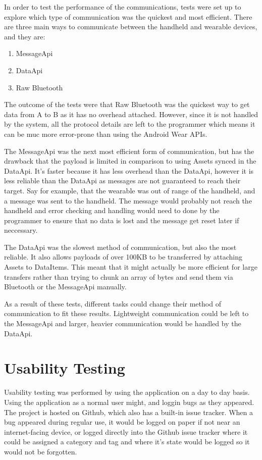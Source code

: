 In order to test the performance of the communications, tests were set up to 
explore which type of communication was the quickest and most efficient. There
are three main ways to communicate between the handheld and wearable devices,
and they are:
\begin{enumerate}
\item MessageApi
\item DataApi
\item Raw Bluetooth
\end{enumerate}

The outcome of the tests were that Raw Bluetooth was the quickest way to get
data from A to B as it has no overhead attached. However, since it is not
handled by the system, all the protocol details are left to the programmer which
means it can be muc more error-prone than using the Android Wear APIs.

The MessageApi was the next most efficient form of communication, but has the
drawback that the payload is limited in comparison to using Assets synced in the
DataApi. It's faster because it has less overhead than the DataApi, however it
is less reliable than the DataApi as messages are not guaranteed to reach their
target. Say for example, that the wearable was out of range of the handheld, and
a message was sent to the handheld. The message would probably not reach the
handheld and error checking and handling would need to done by the programmer to
ensure that no data is lost and the message get reset later if neccessary.

The DataApi was the slowest method of communication, but also the most reliable.
It also allows payloads of over 100KB to be transferred by attaching Assets to
DataItems. This meant that it might actually be more efficient for large
transfers rather than trying to chunk an array of bytes and send them via
Bluetooth or the MessageApi manually.

As a result of these tests, different tasks could change their method of
communication to fit these results. Lightweight communication could be left to 
the MessageApi and larger, heavier communication would be handled by the
DataApi.

\section{Usability Testing}
Usability testing was performed by using the application on a day to day basis.
Using the application as a normal user might, and loggin bugs as they appeared.
The project is hosted on Github, which also has a built-in issue tracker. When
a bug appeared during regular use, it would be logged on paper if not near an
internet-facing device, or logged directly into the Github issue tracker where
it could be assigned a category and tag and where it's state would be logged so
it would not be forgotten.

